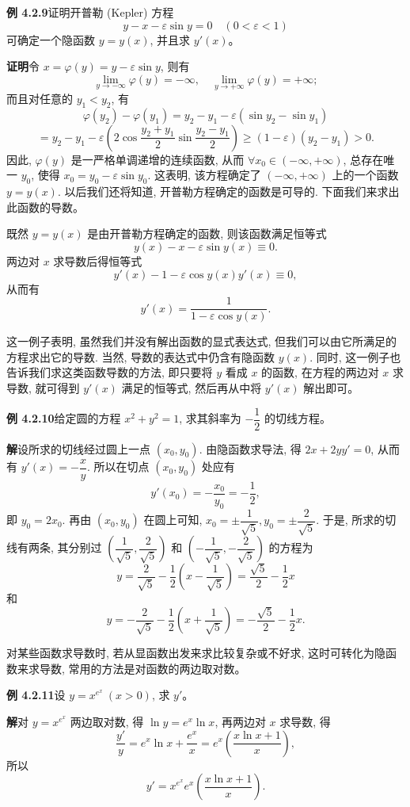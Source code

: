 \documentclass[UTF8,12pt,a4paper,fontset=fandol]{ctexart}
\begin{document}
\noindent\textbf{例 4.2.9}\quad 证明开普勒 (Kepler) 方程
\[
  y-x-\varepsilon\sin y=0
  \quad(0<\varepsilon<1)
\]
可确定一个隐函数 $y=y(x)$, 并且求 $y'(x)$。

\noindent\textbf{证明}\quad 令 $x=\varphi(y)=y-\varepsilon\sin y$, 则有
\[
  \lim_{y\to-\infty}\varphi(y)=-\infty,
  \quad
  \lim_{y\to+\infty}\varphi(y)=+\infty;
\]
而且对任意的 $y_1<y_2$, 有
\[
  \varphi(y_2)-\varphi(y_1)
  =
  y_2-y_1-\varepsilon(\sin y_2-\sin y_1)
\]
\[
  =
  y_2-y_1-\varepsilon\left(2\cos\frac{y_2+y_1}{2}\sin\frac{y_2-y_1}{2}\right)
  \geqslant(1-\varepsilon)(y_2-y_1)>0.
\]
因此, $\varphi(y)$ 是一严格单调递增的连续函数, 从而 $\forall x_0\in(-\infty,+\infty)$, 总存在唯一 $y_0$, 使得 $x_0=y_0-\varepsilon\sin y_0$. 这表明, 该方程确定了 $(-\infty,+\infty)$ 上的一个函数 $y=y(x)$. 以后我们还将知道, 开普勒方程确定的函数是可导的. 下面我们来求出此函数的导数。

既然 $y=y(x)$ 是由开普勒方程确定的函数, 则该函数满足恒等式
\[
  y(x)-x-\varepsilon\sin y(x)\equiv0.
\]
两边对 $x$ 求导数后得恒等式
\[
  y'(x)-1-\varepsilon\cos y(x)y'(x)\equiv0,
\]
从而有
\[
  y'(x)=\frac1{1-\varepsilon\cos y(x)}.
\]

这一例子表明, 虽然我们并没有解出函数的显式表达式, 但我们可以由它所满足的方程求出它的导数. 当然, 导数的表达式中仍含有隐函数 $y(x)$. 同时, 这一例子也告诉我们求这类函数导数的方法, 即只要将 $y$ 看成 $x$ 的函数, 在方程的两边对 $x$ 求导数, 就可得到 $y'(x)$ 满足的恒等式, 然后再从中将 $y'(x)$ 解出即可。

\noindent\textbf{例 4.2.10}\quad 给定圆的方程 $x^2+y^2=1$, 求其斜率为 $-\dfrac12$ 的切线方程。

\noindent\textbf{解}\quad 设所求的切线经过圆上一点 $(x_0,y_0)$. 由隐函数求导法, 得 $2x+2yy'=0$, 从而有 $y'(x)=-\dfrac{x}{y}$. 所以在切点 $(x_0,y_0)$ 处应有
\[
  y'(x_0)=-\frac{x_0}{y_0}=-\frac12,
\]
即 $y_0=2x_0$. 再由 $(x_0,y_0)$ 在圆上可知, $x_0=\pm\dfrac1{\sqrt5},y_0=\pm\dfrac2{\sqrt5}$. 于是, 所求的切线有两条, 其分别过 $\left(\dfrac1{\sqrt5},\dfrac2{\sqrt5}\right)$ 和 $\left(-\dfrac1{\sqrt5},-\dfrac2{\sqrt5}\right)$ 的方程为
\[
  y=\frac2{\sqrt5}-\frac12\left(x-\frac1{\sqrt5}\right)
  =
  \frac{\sqrt5}2-\frac12x
\]
和
\[
  y=-\frac2{\sqrt5}-\frac12\left(x+\frac1{\sqrt5}\right)
  =
  -\frac{\sqrt5}2-\frac12x.
\]

对某些函数求导数时, 若从显函数出发来求比较复杂或不好求, 这时可转化为隐函数来求导数, 常用的方法是对函数的两边取对数。

\noindent\textbf{例 4.2.11}\quad 设 $y=x^{e^x}\ (x>0)$, 求 $y'$。

\noindent\textbf{解}\quad 对 $y=x^{e^x}$ 两边取对数, 得 $\ln y=e^x\ln x$, 再两边对 $x$ 求导数, 得
\[
  \frac{y'}y=e^x\ln x+\frac{e^x}x
  =
  e^x\left(\frac{x\ln x+1}{x}\right),
\]
所以
\[
  y'=x^{e^x}e^x\left(\frac{x\ln x+1}{x}\right).
\]
\end{document}
